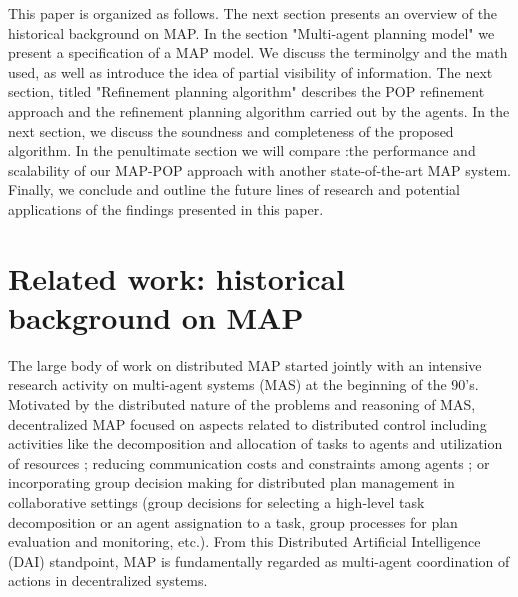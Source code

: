 \documentclass[12pt]{article}
\begin{document}
This paper is organized as follows.
The next section presents an overview of the historical background on MAP.
In the section "Multi-agent planning model" we present a specification of a MAP model.
We discuss the terminolgy and the math used, as well as introduce the idea of partial visibility of information.
The next section, titled "Refinement planning algorithm" describes the POP refinement approach and the refinement planning algorithm carried out by the agents.
In the next section, we discuss the soundness and completeness of the proposed algorithm.
In the penultimate section we will compare :the performance and scalability of our MAP-POP approach with another state-of-the-art MAP system.
Finally, we conclude and outline the future lines of research and potential applications of the findings presented in this paper.

\section{Related work: historical background on MAP}

The large body of work on distributed MAP started jointly with an intensive research activity on multi-agent systems (MAS) at the beginning of the 90’s.
Motivated by the distributed nature of the problems and reasoning of MAS, decentralized MAP focused on aspects related to distributed control including activities like the decomposition and allocation of tasks to agents and utilization of resources \cite{120067}\cite{10.5555/3090522.3090546}; reducing communication costs and constraints among agents \cite{decker_lesser_1992}\cite{Wolverton1998ControllingCI}; or incorporating group decision making for distributed plan management in collaborative settings (group decisions for selecting a high-level task decomposition or an agent assignation to a task, group processes for plan evaluation and monitoring, etc.)\cite{Grosz1999PlanningAA}.
From this Distributed Artificial Intelligence (DAI) standpoint, MAP is fundamentally regarded as multi-agent coordination of actions in decentralized systems.
\end{document}
